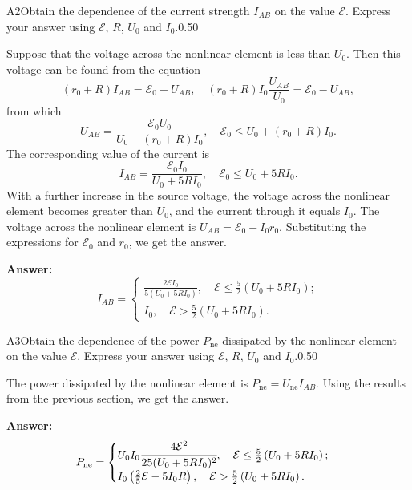 \documentclass[11pt,a4paper]{article}
\begin{document}
\begin{solcard}{A2}{Obtain the dependence of the current strength $I_{AB}$ on the value $\mathcal{E}$. Express your answer using $\mathcal{E}$, $R$, $U_0$ and $I_0$.}{0.50}

Suppose that the voltage across the nonlinear element is less than $U_0$. Then this voltage can be found from the equation $$ (r_0 + R) I_{AB} = \mathcal{E}_0 - U_{AB}, \quad (r_0 + R) I_0 \frac{U_{AB}}{U_0} = \mathcal{E}_0 - U_{AB}, $$from which $$ U_{AB} =  \frac{\mathcal{E}_0 U_0}{U_0 + (r_0 + R) I_0}, \quad \mathcal{E}_0 \le U_0 + (r_0 +R) I_0. $$The corresponding value of the current is $$ I_{AB} =  \frac{\mathcal{E}_0 I_0}{U_0 + 5 R I_0}, \quad \mathcal{E}_0 \le U_0 + 5R I_0. $$With a further increase in the source voltage, the voltage across the nonlinear element becomes greater than $U_0$, and the current through it equals $I_0$. The voltage across the nonlinear element is $U_{AB} = \mathcal{E}_0 - I_0 r_0$. Substituting the expressions for $\mathcal{E}_0$ and $r_0$, we get the answer.

\par\smallskip\noindent\textbf{Answer:} $$ I_{AB} = \begin{cases} \frac{2 \mathcal{E} I_0}{5 (U_0 + 5R I_0)},  \quad \mathcal{E} \le \frac{5}{2} \left(U_0  + 5 R I_0 \right);\\ I_0, \quad \mathcal{E} > \frac{5}{2} \left(U_0  + 5 R I_0 \right). \end{cases} $$
\end{solcard}

\begin{solcard}{A3}{Obtain the dependence of the power $P_\text{ne}$ dissipated by the nonlinear element on the value $\mathcal{E}$. Express your answer using $\mathcal{E}$, $R$, $U_0$ and $I_0$.}{0.50}

The power dissipated by the nonlinear element is $P_{\text{ne}} = U_{\text{ne}} I_{AB}$. Using the results from the previous section, we get the answer.

\par\smallskip\noindent\textbf{Answer:} $$ P_{\text{ne}} = \begin{cases} U_0 I_0 \cfrac{4 \mathcal{E}^2}{25 (U_0 + 5 R I_0)^2}, \quad  \mathcal{E} \le \frac{5}{2} \left(U_0  + 5 R I_0 \right);\\ I_0 \left( \frac{2}{5} \mathcal{E} - 5 I_0 R\right),  \quad  \mathcal{E} > \frac{5}{2} \left(U_0  + 5R I_0 \right). \end{cases} $$
\end{solcard}
\end{document}
